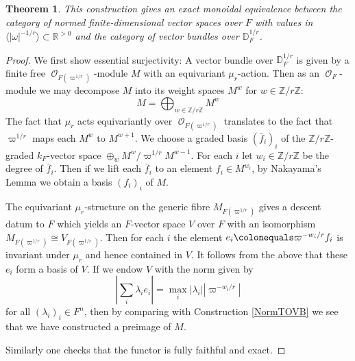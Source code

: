 \documentclass{article}
\DeclareMathOperator{\CO}{\mathcal{O}}
\newcommand{\BR}{{\mathbb{R}}}
\newcommand{\BZ}{{\mathbb{Z}}}
\newcommand{\Dr}[1][r]{\mathbb{D}_F^{1/#1}}
\newcommand{\defeq}{\colonequals}
\theoremstyle{definition}
\theoremstyle{plain}
\newtheorem{theorem}[definition]{Theorem}
\begin{document}
\begin{theorem} \label{NormVBEq}
    This construction gives an exact monoidal equivalence between the category of normed finite-dimensional vector spaces over $F$ with values in $\langle |\omega|^{-1/r} \rangle \subset \BR^{>0}$ and the category of vector bundles over $\Dr$.
\end{theorem}
\begin{proof}
    We first show essential surjectivity: A vector bundle over $\Dr$ is given by a finite free $\CO_{F(\varpi^{1/r})}$-module $M$ with an equivariant $\mu_r$-action. Then as an $\CO_F$-module we may decompose $M$ into its weight spaces $M^w$ for $w \in \BZ/r\BZ$:
    \begin{equation*}
        M=\bigoplus_{w \in \BZ/r\BZ} M^w
    \end{equation*}
    The fact that $\mu_r$ acts equivariantly over $\CO_{F(\varpi^{1/r})}$ translates to the fact that $\varpi^{1/r}$ maps each $M^w$ to $M^{w+1}$. We choose a graded basis $(\bar f_i)_i$ of the $\BZ/r\BZ$-graded $k_F$-vector space $\oplus_w M^w/\varpi^{1/r} M^{w-1}$. For each $i$ let $w_i \in \BZ/r\BZ$ be the degree of $\bar f_i$. Then if we lift each $\bar f_i$ to an element $f_i \in M^{w_i}$, by Nakayama's Lemma we obtain a basis $(f_i)_i$ of $M$. 

    The equivariant $\mu_r$-structure on the generic fibre $M_{F(\varpi^{1/r})}$ gives a descent datum to $F$ which yields an $F$-vector space $V$ over $F$ with an isomorphism $M_{F(\varpi^{1/r})} \cong V_{F(\varpi^{1/r})}$. Then for each $i$ the element $e_i \defeq \varpi^{-w_i/r} f_i$ is invariant under $\mu_r$ and hence contained in $V$. It follows from the above that these $e_i$ form a basis of $V$. If we endow $V$ with the norm given by
    \begin{equation*}
        |\sum_i \lambda_i e_i|=\max_i |\lambda_i| |\varpi^{-w_i/r}|
    \end{equation*}
    for all $(\lambda_i)_i \in F^n$, then by comparing with Construction \ref{NormTOVB} we see that we have constructed a preimage of $M$.

    Similarly one checks that the functor is fully faithful and exact.
\end{proof}
\end{document}
